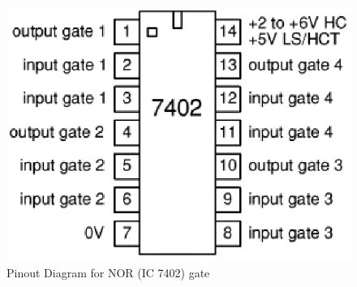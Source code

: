 \begin{figure}[H]
    \centering
    \includegraphics[width=0.6\columnwidth]{images/pinout_nor.png}
    \caption{Pinout Diagram for NOR (IC 7402) gate}
    \label{pinout3}
\end{figure}